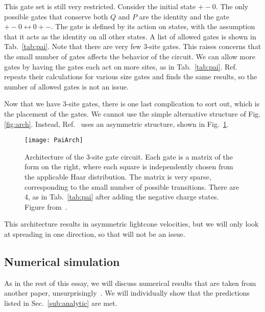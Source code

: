 \documentclass[a4paper,12pt]{article}
\begin{document}
This gate set is still very restricted. Consider the initial state $+-0$. The only possible gates that conserve both $Q$ and $P$ are the identity and the gate $+-0\leftrightarrow 0+-$. The gate is defined by its action on states, with the assumption that it acts as the identity on all other states. A list of allowed gates is shown in Tab.~\ref{tab:pai}. Note that there are very few 3-site gates. This raises concerns that the small number of gates affects the behavior of the circuit. We can allow more gates by having the gates each act on more sites, as in Tab.~\ref{tab:pai}. Ref.~\cite{PaiFracton} repeats their calculations for various size gates and finds the same results, so the number of allowed gates is not an issue.


Now that we have 3-site gates, there is one last complication to sort out, which is the placement of the gates. We cannot use the simple alternative structure of Fig.\ref{fig:arch}. Instead, Ref.~\cite{PaiFracton} uses an asymmetric structure, shown in Fig.~\ref{fig:PaiArch}.
\begin{figure}
	\centering
	\texttt{[image: PaiArch]}
	\caption{Architecture of the 3-site gate circuit. Each gate is a matrix of the form on the right, where each square is independently chosen from the applicable Haar distribution. The matrix is very sparse, corresponding to the small number of possible transitions. There are 4, as in Tab.~\ref{tab:pai} after adding the negative charge states. Figure from~\cite{PaiFracton}.}
	\label{fig:PaiArch}
\end{figure}
This architecture results in asymmetric lightcone velocities, but we will only look at spreading in one direction, so that will not be an issue.

\subsection{Numerical simulation} \label{sub:numeric}

As in the rest of this essay, we will discuss numerical results that are taken from another paper, unsurprisingly~\cite{PaiFracton}. We will individually show that the predictions listed in Sec.~\ref{sub:analytic} are met.
\end{document}
